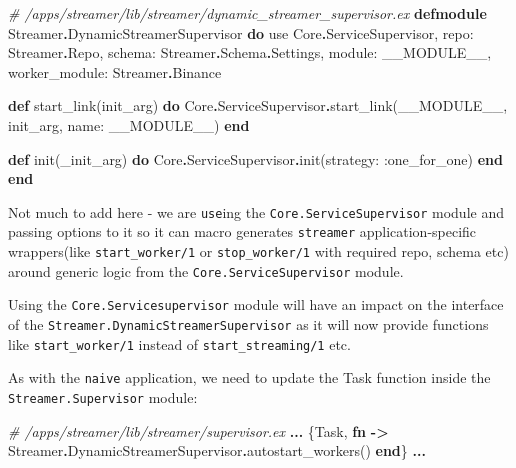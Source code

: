 \documentclass[
]{book}
\newenvironment{Shaded}{\begin{snugshade}}{\end{snugshade}}
\newcommand{\CommentTok}[1]{\textcolor[rgb]{0.56,0.35,0.01}{\textit{#1}}}
\newcommand{\ConstantTok}[1]{\textcolor[rgb]{0.00,0.00,0.00}{#1}}
\newcommand{\ImportTok}[1]{#1}
\newcommand{\KeywordTok}[1]{\textcolor[rgb]{0.13,0.29,0.53}{\textbf{#1}}}
\newcommand{\NormalTok}[1]{#1}
\newcommand{\OperatorTok}[1]{\textcolor[rgb]{0.81,0.36,0.00}{\textbf{#1}}}
\newcommand{\VariableTok}[1]{\textcolor[rgb]{0.00,0.00,0.00}{#1}}
\begin{document}
\begin{Shaded}
\begin{Highlighting}[]
\CommentTok{\# /apps/streamer/lib/streamer/dynamic\_streamer\_supervisor.ex}
\KeywordTok{defmodule} \ConstantTok{Streamer}\OperatorTok{.}\ConstantTok{DynamicStreamerSupervisor} \KeywordTok{do}
  \ImportTok{use} \ConstantTok{Core}\OperatorTok{.}\ConstantTok{ServiceSupervisor}\NormalTok{,}
    \VariableTok{repo:} \ConstantTok{Streamer}\OperatorTok{.}\ConstantTok{Repo}\NormalTok{,}
    \VariableTok{schema:} \ConstantTok{Streamer}\OperatorTok{.}\ConstantTok{Schema}\OperatorTok{.}\ConstantTok{Settings}\NormalTok{,}
    \VariableTok{module:} \ConstantTok{\_\_MODULE\_\_}\NormalTok{,}
    \VariableTok{worker\_module:} \ConstantTok{Streamer}\OperatorTok{.}\ConstantTok{Binance}

  \KeywordTok{def}\NormalTok{ start\_link(init\_arg) }\KeywordTok{do}
    \ConstantTok{Core}\OperatorTok{.}\ConstantTok{ServiceSupervisor}\OperatorTok{.}\NormalTok{start\_link(}\ConstantTok{\_\_MODULE\_\_}\NormalTok{, init\_arg, }\VariableTok{name:} \ConstantTok{\_\_MODULE\_\_}\NormalTok{)}
  \KeywordTok{end}

  \KeywordTok{def}\NormalTok{ init(\_init\_arg) }\KeywordTok{do}
    \ConstantTok{Core}\OperatorTok{.}\ConstantTok{ServiceSupervisor}\OperatorTok{.}\NormalTok{init(}\VariableTok{strategy:} \VariableTok{:one\_for\_one}\NormalTok{)}
  \KeywordTok{end}
\KeywordTok{end}
\end{Highlighting}
\end{Shaded}

Not much to add here - we are \texttt{use}ing the \texttt{Core.ServiceSupervisor} module and passing options to it so it can macro generates \texttt{streamer} application-specific wrappers(like \texttt{start\_worker/1} or \texttt{stop\_worker/1} with required repo, schema etc) around generic logic from the \texttt{Core.ServiceSupervisor} module.

Using the \texttt{Core.Servicesupervisor} module will have an impact on the interface of the \texttt{Streamer.DynamicStreamerSupervisor} as it will now provide functions like \texttt{start\_worker/1} instead of \texttt{start\_streaming/1} etc.

As with the \texttt{naive} application, we need to update the Task function inside the \texttt{Streamer.Supervisor} module:

\begin{Shaded}
\begin{Highlighting}[]
\CommentTok{\# /apps/streamer/lib/streamer/supervisor.ex}
      \OperatorTok{...}
\NormalTok{      \{}\ConstantTok{Task}\NormalTok{,}
       \KeywordTok{fn} \OperatorTok{{-}\textgreater{}}
         \ConstantTok{Streamer}\OperatorTok{.}\ConstantTok{DynamicStreamerSupervisor}\OperatorTok{.}\NormalTok{autostart\_workers()}
       \KeywordTok{end}\NormalTok{\}}
      \OperatorTok{...}
\end{Highlighting}
\end{Shaded}
\end{document}
